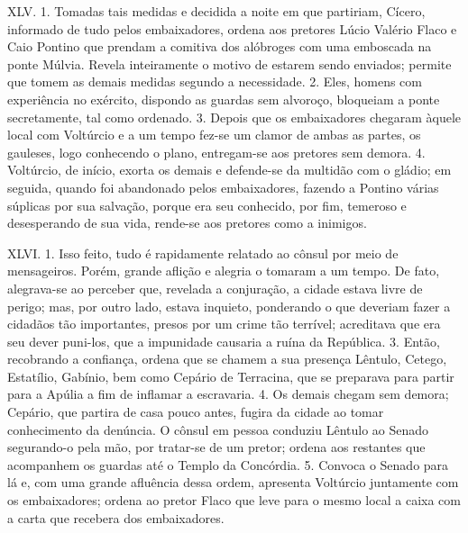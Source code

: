 XLV. 1. Tomadas tais medidas e decidida a noite em que partiriam, Cícero,
informado de tudo pelos embaixadores, ordena aos pretores Lúcio Valério Flaco e
Caio Pontino que prendam a comitiva dos alóbroges com uma emboscada na ponte
Múlvia. Revela inteiramente o motivo de estarem sendo enviados; permite que
tomem as demais medidas segundo a necessidade. 2. Eles, homens com experiência
no exército, dispondo as guardas sem alvoroço, bloqueiam a ponte secretamente,
tal como ordenado. 3. Depois que os embaixadores chegaram àquele local com
Voltúrcio e a um tempo fez-se um clamor de ambas as partes, os gauleses, logo
conhecendo o plano, entregam-se aos pretores sem demora. 4. Voltúrcio, de
início, exorta os demais e defende-se da multidão com o gládio; em seguida,
quando foi abandonado pelos embaixadores, fazendo a Pontino várias súplicas por
sua salvação, porque era seu conhecido, por fim, temeroso e desesperando de sua
vida, rende-se aos pretores como a inimigos.

XLVI. 1. Isso feito, tudo é rapidamente relatado ao cônsul por meio de
mensageiros. Porém, grande aflição e alegria o tomaram a um tempo. De fato,
alegrava-se ao perceber que, revelada a conjuração, a cidade estava livre de
perigo; mas, por outro lado, estava inquieto, ponderando o que deveriam fazer a
cidadãos tão importantes, presos por um crime tão terrível; acreditava que era
seu dever puni-los, que a impunidade causaria a ruína da República. 3. Então,
recobrando a confiança, ordena que se chamem a sua presença Lêntulo,
Cetego, Estatílio, Gabínio, bem como Cepário de Terracina, que se preparava
para partir para a Apúlia a fim de inflamar a escravaria. 4. Os demais chegam
sem demora; Cepário, que partira de casa pouco antes, fugira da cidade ao tomar
conhecimento da denúncia. O cônsul em pessoa conduziu Lêntulo ao Senado
segurando-o pela mão, por tratar-se de um pretor; ordena aos restantes que
acompanhem os guardas até o Templo da Concórdia. 5. Convoca o Senado para lá e,
com uma grande afluência dessa ordem, apresenta Voltúrcio juntamente com os
embaixadores; ordena ao pretor Flaco que leve para o mesmo local a caixa com a
carta que recebera dos embaixadores.


